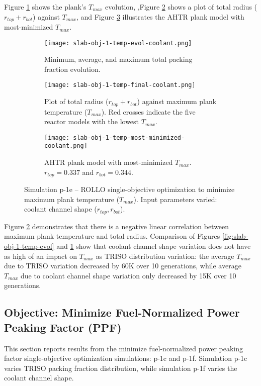 Figure \ref{fig:slab-obj-1-temp-evol-coolant} shows the plank's $T_{max}$ evolution, 
,Figure \ref{fig:slab-obj-1-temp-final-coolant} shows a plot of total radius 
($r_{top} + r_{bot}$) against $T_{max}$, and Figure 
\ref{fig:slab-obj-1-temp-most-minimized-coolant} illustrates the \gls{AHTR} plank model 
with most-minimized $T_{max}$. 
\begin{figure}[htbp!]
    \centering
    \begin{subfigure}{\textwidth}
        \texttt{[image: slab-obj-1-temp-evol-coolant.png]}
        \caption{Minimum, average, and maximum total packing fraction evolution.}
        \label{fig:slab-obj-1-temp-evol-coolant} 
    \end{subfigure}
    \begin{subfigure}{\textwidth}
        \texttt{[image: slab-obj-1-temp-final-coolant.png]}
        \caption{Plot of total radius ($r_{top} + r_{bot}$) against maximum plank 
        temperature ($T_{max}$). Red crosses indicate the five reactor models with the 
        lowest $T_{max}$.}
        \label{fig:slab-obj-1-temp-final-coolant} 
    \end{subfigure}
    \begin{subfigure}{\textwidth}
        \texttt{[image: slab-obj-1-temp-most-minimized-coolant.png]}
        \caption{\gls{AHTR} plank model with most-minimized $T_{max}$. 
        $r_{top} = 0.337$ and $r_{bot} = 0.344$.}
        \label{fig:slab-obj-1-temp-most-minimized-coolant} 
    \end{subfigure}
    \caption{Simulation p-1e -- ROLLO single-objective optimization to minimize 
    maximum plank temperature ($T_{max}$). Input parameters varied: coolant channel shape 
    ($r_{top}, r_{bot}$).}
    \label{fig:slab-obj-1-temp-coolant}
\end{figure}

Figure \ref{fig:slab-obj-1-temp-final-coolant} demonstrates that there is a negative 
linear correlation between maximum plank temperature and total radius. 
Comparison of Figures \ref{fig:slab-obj-1-temp-evol} and 
\ref{fig:slab-obj-1-temp-evol-coolant} show that coolant channel shape variation 
does not have as high of an impact on $T_{max}$ as \gls{TRISO} distribution variation:  
the average $T_{max}$ due to \gls{TRISO} variation decreased by 60K over 10 generations, 
while average $T_{max}$ due to coolant channel shape variation only decreased by 15K
over 10 generations. 

\subsection{Objective: Minimize Fuel-Normalized Power Peaking Factor (PPF)}
This section reports results from the minimize fuel-normalized power peaking factor 
single-objective optimization simulations: p-1c and p-1f. 
Simulation p-1c varies \gls{TRISO} packing fraction distribution, while simulation p-1f 
varies the coolant channel shape. 

